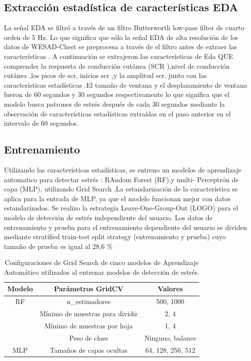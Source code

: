 \subsection*{Extracción estadística de características EDA}

La señal EDA se filtró a través de un filtro  Butterworth low-pass filter de cuarto orden de 5 Hz. Lo que significa que sólo la señal EDA de alta resolución de los datos de WESAD-Chest se preprocesa a través de  el filtro  antes de extraer las características . A continuación se extrajeron las características de Eda QUE comprender la respuesta de conducción cutánea (SCR ),nivel de conducción cutánea ,los picos de scr, inicios scr ,y la amplitud scr. junto con  las características estadísticas .El tamaño de ventana y el desplazamiento de ventana fueron de 60 segundos y 30 segundos respectivamente lo que significa que  el modelo busca patrones de estrés después de cada 30 segundos mediante la observación de características estadísticas extraídas  en el paso anterior  en el intervalo de 60 segundos.


\subsection{Entrenamiento}

Utilizando las características estadísticas, se entreno  un modelos de aprendizaje automatico para detectar  estrés : RAndom Forest (RF),y multi- Perceptrón de capa (MLP), utilizando Grid Search .La estandarización de la característica  se aplica para la entrada de MLP, ya que el  modelo funcionan mejor  con datos estandarizados.
Se realizo la estrategia Leave-One-Group-Out (LOGO) para el modelo de detección de estrés independiente del usuario.
 Los datos de entrenamiento y prueba para el entrenamiento dependiente del usuario se dividen mediante   stratified train-test split strategy  (entrenamiento y prueba) cuyo tamaño de prueba es igual al 28,6 \%



\begin{table}[h!]
  \centering
  \caption{Configuraciones de Grid Search de cinco modelos de Aprendizaje Automático utilizados al entrenar modelos de detección de estrés.}
  \label{tab:GridSearchConfiguration}
  \begin{tabular}{|c|c|c|}
    \hline
    \textbf{Modelo} & \textbf{Parámetros GridCV} & \textbf{Valores} \\
  
    \hline
    RF & n\_estimadores & 500, 1000 \\
    & Mínimo de muestras para dividir & 2, 4 \\
    & Mínimo de muestras por hoja & 1, 4 \\
    & Peso de clase & Ninguno, balance \\
    \hline
    MLP & Tamaños de capas ocultas & 64, 128, 256, 512 \\
    \hline
  
  \end{tabular}
\end{table}




